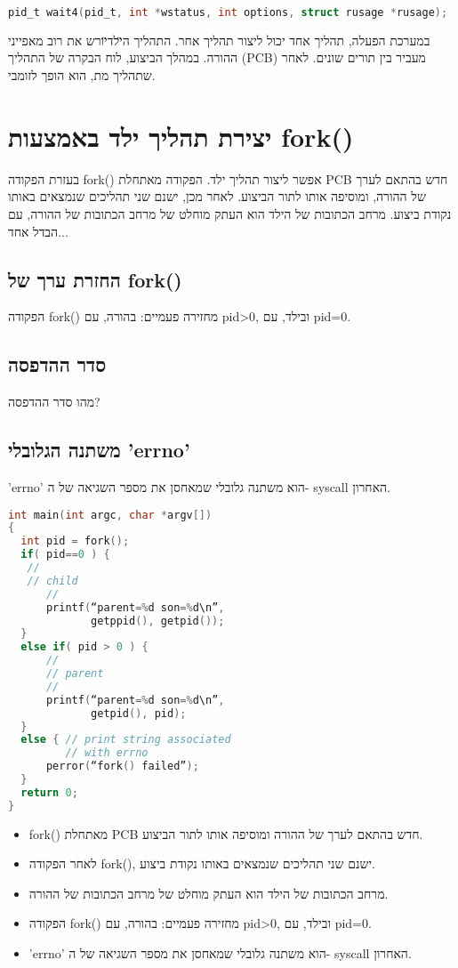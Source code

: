 \documentclass[12pt]{report}
\begin{document}
  \begin{lstlisting}[language=C]  pid_t wait4(pid_t, int *wstatus, int options, struct rusage *rusage);  \end{lstlisting}  
  \begin{tcolorbox}[colback=yellow!5, colframe=yellow!80!black, title={\faBookmark נקודות מפתח}]  במערכת הפעלה, תהליך אחד יכול ליצור תהליך אחר. התהליך ה\"ילד\" יורש את רוב מאפייני ההורה. במהלך הביצוע, לוח הבקרה של התהליך (PCB) מעביר בין תורים שונים. לאחר שתהליך מת, הוא הופך לזומבי.  \end{tcolorbox}  

\section{יצירת תהליך ילד באמצעות fork()} 
 בעזרת הפקודה fork() אפשר ליצור תהליך ילד. הפקודה מאתחלת PCB חדש בהתאם לערך של ההורה, ומוסיפה אותו לתור הביצוע. לאחר מכן, ישנם שני תהליכים שנמצאים באותו נקודת ביצוע. מרחב הכתובות של הילד הוא העתק מוחלט של מרחב הכתובות של ההורה, עם הבדל אחד... 

 \subsection{החזרת ערך של fork()} 
 הפקודה fork() מחזירה פעמיים: בהורה, עם pid>0, ובילד, עם pid=0. 

 \subsection{סדר ההדפסה} 
 מהו סדר ההדפסה? 

 \subsection{משתנה הגלובלי 'errno'} 
 'errno' הוא משתנה גלובלי שמאחסן את מספר השגיאה של ה- syscall האחרון.
\begin{lstlisting}[language=C] 
int main(int argc, char *argv[]) 
{ 
  int pid = fork(); 
  if( pid==0 ) { 
   // 
   // child 
      // 
      printf(“parent=%d son=%d\n”, 
             getppid(), getpid()); 
  } 
  else if( pid > 0 ) { 
      // 
      // parent 
      // 
      printf(“parent=%d son=%d\n”, 
             getpid(), pid); 
  } 
  else { // print string associated 
         // with errno   
      perror(“fork() failed”); 
  } 
  return 0; 
} 
\end{lstlisting}
\begin{tcolorbox}[colback=yellow!5, colframe=yellow!80!black, title={\faBookmark נקודות מפתח}] 
\begin{itemize} 
\item fork() מאתחלת PCB חדש בהתאם לערך של ההורה ומוסיפה אותו לתור הביצוע. 
\item לאחר הפקודה fork(), ישנם שני תהליכים שנמצאים באותו נקודת ביצוע. 
\item מרחב הכתובות של הילד הוא העתק מוחלט של מרחב הכתובות של ההורה. 
\item הפקודה fork() מחזירה פעמיים: בהורה, עם pid>0, ובילד, עם pid=0. 
\item 'errno' הוא משתנה גלובלי שמאחסן את מספר השגיאה של ה- syscall האחרון. 
\end{itemize} 
\end{tcolorbox}
\end{document}
